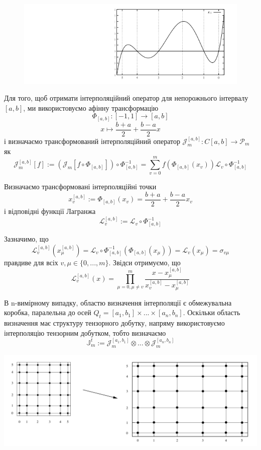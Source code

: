 \documentclass[12pt]{report}
\begin{document}
		\begin{figure}[h]{
				\includegraphics{2_1}
			}
		\end{figure}
	\par Для того, щоб отримати інтерполяційний оператор для непорожнього інтервалу $[a,b]$, ми використовуємо афінну трансформацію
	$$\Phi_{[a,b]}:[-1,1]\rightarrow [a,b]$$
	$$x\mapsto \frac{b+a}{2}+\frac{b-a}{2}x$$
	і визначаємо трансформований інтерполяційний оператор $\mathcal{J}_m^{[a,b]}:C[a,b]\rightarrow\mathcal{P}_m$ як
	$$\mathcal{J}_m^{[a,b]}[f] := (\mathcal{J}_m[f\circ\Phi_{[a,b]}])\circ \Phi_{[a,b]}^{-1}=\sum_{v=0}^{m}f(\Phi_{[a,b]}(x_v))\mathcal{L}_v\circ\Phi_{[a,b]}^{-1}$$
	\par Визначаємо трансформовані інтерполяційні точки
	$$x_v^{[a,b]}:=\Phi_{[a,b]}(x_v)=\frac{b+a}{2}+\frac{b-a}{2}x_v$$
	і відповідні функції Лагранжа
	$$\mathcal{L}_v^{[a,b]}:=\mathcal{L}_v\circ\Phi_{[a,b]}^{-1}$$
	\par Зазначимо, що
	$$\mathcal{L}_v^{[a,b]}(x_\mu^{[a,b]})=\mathcal{L}_v\circ\Phi_{[a,b]}^{-1}(\Phi_{[a,b]}(x_\mu))=\mathcal{L}_v(x_\mu)=\sigma_{v\mu}$$
	правдиве для всіх $v,\mu\in\{0,...,m\}$. Звідси отримуємо, що
	$$\mathcal{L}_v^{[a,b]}(x)=\prod_{\mu=0,\mu\not=v}^{m}\frac{x-x_\mu^{[a,b]}}{x_v^{[a,b]}-x_\mu^{[a,b]}}$$
	\par В n-вимірному випадку, областю визначення інтерполяції є обмежувальна коробка, паралельна до осей $Q_t=[a_1,b_1]\times...\times[a_n,b_n]$. Оскільки область визначення має структуру тензорного добутку, напряму використовуємо інтерполяцію тензорним добутком, тобто визначаємо 
	$$\mathbb{J}_m^t:=\mathcal{J}_m^{[a_1,b_1]}\otimes...\otimes\mathcal{J}_m^{[a_n,b_n]}$$ 
	\begin{center}
		\includegraphics[scale=0.5]{2_6}
	\end{center}
\end{document}
